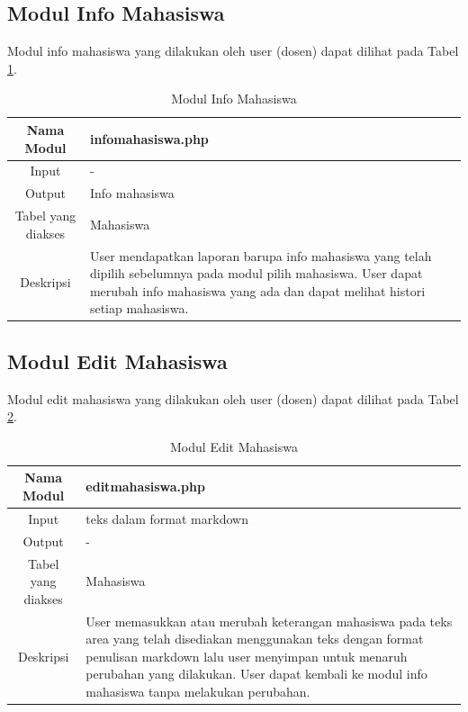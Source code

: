 \subsection{Modul Info Mahasiswa}
Modul info mahasiswa yang dilakukan oleh user (dosen) dapat dilihat pada Tabel
\ref{tab:modulinfomahasiswa}.

\begin{table}[h]
\centering
\caption[Tabel 4-3 Modul Info Mahasiswa]{Modul Info Mahasiswa}
\label{tab:modulinfomahasiswa}
\begin{tabular}{|c|p{7cm}|}
\hline
Nama Modul & infomahasiswa.php\\
\hline
Input & -\\
\hline
Output & Info mahasiswa\\
\hline
Tabel yang diakses & Mahasiswa\\
\hline
Deskripsi & User mendapatkan laporan barupa info mahasiswa yang telah dipilih
sebelumnya pada modul pilih mahasiswa. User dapat merubah info mahasiswa yang
ada dan dapat melihat histori setiap mahasiswa.\\
\hline
\end{tabular}
\end{table}

\subsection{Modul Edit Mahasiswa}
Modul edit mahasiswa yang dilakukan oleh user (dosen) dapat dilihat pada Tabel
\ref{tab:moduleditmahasiswa}.

\begin{table}[h]
\centering
\caption[Tabel 4-4 Modul Edit Mahasiswa]{Modul Edit Mahasiswa}
\label{tab:moduleditmahasiswa}
\begin{tabular}{|c|p{7cm}|}
\hline
Nama Modul & editmahasiswa.php\\
\hline
Input & teks dalam format markdown\\
\hline
Output & -\\
\hline
Tabel yang diakses & Mahasiswa\\
\hline
Deskripsi & User memasukkan atau merubah keterangan mahasiswa pada teks area
yang telah disediakan menggunakan teks dengan format penulisan markdown lalu
user menyimpan untuk menaruh perubahan yang dilakukan. User dapat kembali ke
modul info mahasiswa tanpa melakukan perubahan.\\
\hline
\end{tabular}
\end{table}


